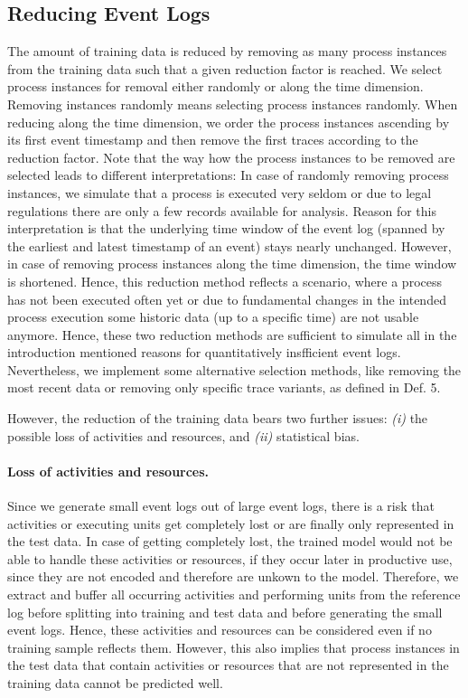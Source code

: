 \documentclass[runningheads]{llncs}
\begin{document}
\subsection{Reducing Event Logs}\label{Sec:Reducing-event-logs}
\vspace{-5pt}
The amount of training data is reduced by removing as many process instances from the training data such that a given reduction factor is reached. We select process instances for removal either randomly or along the time dimension. Removing instances randomly means selecting process instances randomly. When reducing along the time dimension, we order the process instances ascending by its first event timestamp and then remove the first traces according to the reduction factor. Note that the way how the process instances to be removed are selected leads to different interpretations: In case of randomly removing process instances, we simulate that a process is executed very seldom or due to legal regulations there are only a few records available for analysis. Reason for this interpretation is that the underlying time window of the event log (spanned by the earliest and latest timestamp of an event) stays nearly unchanged. However, in case of removing process instances along the time dimension, the time window is shortened. Hence, this reduction method reflects a scenario, where a process has not been executed often yet or due to fundamental changes in the intended process execution some historic data (up to a specific time) are not usable anymore. Hence, these two reduction methods are sufficient to simulate all in the introduction mentioned reasons for quantitatively insfficient event logs. Nevertheless, we implement some alternative selection methods, like removing the most recent data or removing only specific trace variants, as defined in Def. 5.

However, the reduction of the training data bears two further issues:  \textit{(i)} the possible loss of activities and resources, and \textit{(ii)} statistical bias.

\paragraph{Loss of activities and resources.}
\vspace{-8pt}
Since we generate small event logs out of large event logs, there is a risk that activities or executing units get completely lost or are finally only represented in the test data. In case of getting completely lost, the trained model would not be able to handle these activities or resources, if they occur later in productive use, since they are not encoded and therefore are unkown to the model. Therefore, we extract and buffer all occurring activities and performing units from the reference log before splitting into training and test data and before generating the small event logs. Hence, these activities and resources can be considered even if no training sample reflects them. However, this also implies that process instances in the test data that contain activities or resources that are not represented in the training data cannot be predicted well. 
\end{document}
